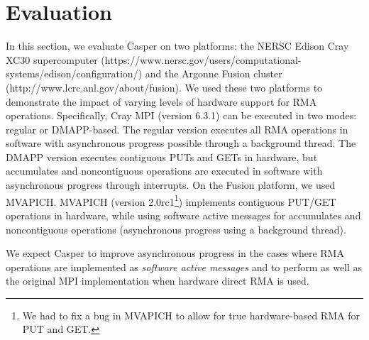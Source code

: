 \section{Evaluation}\label{sec:casper-eva}

In this section, we evaluate Casper on two platforms: the NERSC Edison
Cray XC30 supercomputer
(https://www.nersc.gov/users/computational-systems/edison/configuration/)
and the Argonne Fusion cluster
(http://www.lcrc.anl.gov/about/fusion).  We used these two platforms
to demonstrate the impact of varying levels of hardware support for
RMA operations.  Specifically, Cray MPI (version 6.3.1) can be
executed in two modes: regular or DMAPP-based.  The regular version
executes all RMA operations in software with asynchronous progress
possible through a background thread.  The DMAPP version executes
contiguous PUTs and GETs in hardware, but accumulates and
noncontiguous operations are executed in software with asynchronous
progress through interrupts.  On the Fusion platform, we used
MVAPICH.  MVAPICH (version
2.0rc1\footnote{We had to fix a bug in MVAPICH to allow for true
  hardware-based RMA for PUT and GET.}) implements contiguous PUT/GET
operations in hardware, while using software active messages for
accumulates and noncontiguous operations (asynchronous progress using
a background thread).

We expect Casper to improve asynchronous progress in the cases where
RMA operations are implemented as \emph{software active messages} and
to perform as well as the original MPI implementation when hardware
direct RMA is used.



